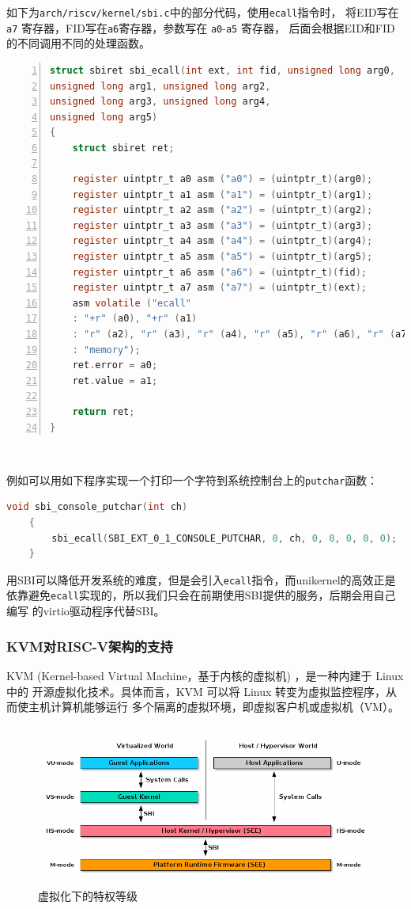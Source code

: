 \documentclass{../runikraft-report}
\begin{document}
如下为\texttt{arch/riscv/kernel/sbi.c}中的部分代码，使用\texttt{ecall}指令时，
将EID写在\texttt{a7} 寄存器，FID写在\texttt{a6}寄存器，参数写在 \texttt{a0}-\texttt{a5} 寄存器，
后面会根据EID和FID的不同调用不同的处理函数。
\begin{lstlisting}[language=C,numbers=left]
struct sbiret sbi_ecall(int ext, int fid, unsigned long arg0,
unsigned long arg1, unsigned long arg2,
unsigned long arg3, unsigned long arg4,
unsigned long arg5)
{
	struct sbiret ret;

	register uintptr_t a0 asm ("a0") = (uintptr_t)(arg0);
	register uintptr_t a1 asm ("a1") = (uintptr_t)(arg1);
	register uintptr_t a2 asm ("a2") = (uintptr_t)(arg2);
	register uintptr_t a3 asm ("a3") = (uintptr_t)(arg3);
	register uintptr_t a4 asm ("a4") = (uintptr_t)(arg4);
	register uintptr_t a5 asm ("a5") = (uintptr_t)(arg5);
	register uintptr_t a6 asm ("a6") = (uintptr_t)(fid);
	register uintptr_t a7 asm ("a7") = (uintptr_t)(ext);
	asm volatile ("ecall"
	: "+r" (a0), "+r" (a1)
	: "r" (a2), "r" (a3), "r" (a4), "r" (a5), "r" (a6), "r" (a7)
	: "memory");
	ret.error = a0;
	ret.value = a1;

	return ret;
}
\end{lstlisting}​

例如可以用如下程序实现一个打印一个字符到系统控制台上的\texttt{putchar}函数：
\begin{lstlisting}[language=C]
    void sbi_console_putchar(int ch)
    {
    	sbi_ecall(SBI_EXT_0_1_CONSOLE_PUTCHAR, 0, ch, 0, 0, 0, 0, 0);
    }
\end{lstlisting}

用SBI可以降低开发系统的难度，但是会引入\texttt{ecall}指令，而unikernel的高效正是
依靠避免\texttt{ecall}实现的，所以我们只会在前期使用SBI提供的服务，后期会用自己编写
的virtio驱动程序代替SBI。


\subsubsection{KVM对RISC-V架构的支持}
KVM (Kernel-based Virtual Machine，基于内核的虚拟机)  ，是一种内建于 Linux 中的
开源虚拟化技术。具体而言，KVM 可以将 Linux 转变为虚拟监控程序，从而使主机计算机能够运行
多个隔离的虚拟环境，即虚拟客户机或虚拟机（VM）。
\begin{figure}[!hbt]
	\centering
	\includegraphics[width=0.9\linewidth]{assets/riscv-sbi-intro2.png}
	\caption{虚拟化下的特权等级}
	\label{fig:w4}
\end{figure}
\end{document}
